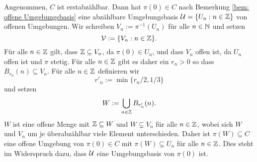 \documentclass[a4paper,10pt]{article}
\begin{document}
Angenommen, $C$ ist erstabzählbar. Dann hat $\pi(0) \in C$ nach Bemerkung \ref{bem: offene Umgebungsbasis} eine abzählbare Umgebungsbasis $\mathcal{U} = \{U_n : n \in \mathbb{Z}\}$ von offenen Umgebungen. Wir schreiben $V_n := \pi^{-1}(U_n)$ für alle $n \in \mathbb{N}$ und setzen
\[
 \mathcal{V} := \{V_n : n \in \mathbb{Z}\}.
\]
Für alle $n \in \mathbb{Z}$ gilt, dass $\mathbb{Z} \subseteq V_n$, da $\pi(0) \in U_n$, und dass $V_n$ offen ist, da $U_n$ offen ist und $\pi$ stetig. Für alle $n \in \mathbb{Z}$ gibt es daher ein $r_n > 0$ so dass $B_{r_n}(n) \subseteq V_n$. Für alle $n \in \mathbb{Z}$ definieren wir
\[
 r'_n := \min\{r_n/2, 1/3\}
\]
und setzen
\[
 W := \bigcup_{n \in \mathbb{Z}} B_{r'_n}(n).
\]
$W$ ist eine offene Menge mit $\mathbb{Z} \subseteq W$ und $W \subsetneq V_n$ für alle $n \in \mathbb{Z}$, wobei sich $W$ und $V_n$ um je überabzählbar viele Element unterschieden. Daher ist $\pi(W) \subseteq C$ eine offene  Umgebung von $\pi(0) \in C$ mit $\pi(W) \subsetneq U_n$ für alle $n \in \mathbb{Z}$. Dies steht im Widerspruch dazu, dass $\mathcal{U}$ eine Umgebungsbasis von $\pi(0)$ ist.
\end{document}

